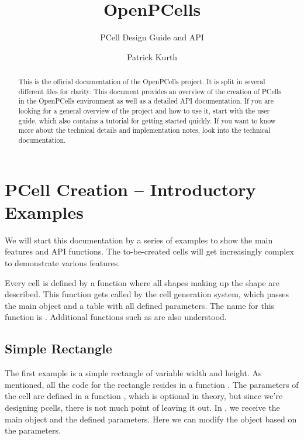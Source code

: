 

\title{OpenPCells}
\subtitle{PCell Design Guide and API}
\author{Patrick Kurth}


\maketitle
\begin{abstract}
    \noindent This is the official documentation of the OpenPCells project.  It is split in several different files for clarity. This document provides an overview
    of the creation of PCells in the OpenPCells environment as well as a detailed API documentation.  If you are looking for a general overview of the project and
    how to use it, start with the user guide, which also contains a tutorial for getting started quickly. If you want to know more about the technical details and
    implementation notes, look into the technical documentation.
\end{abstract}

\tableofcontents

\section{PCell Creation -- Introductory Examples}
We will start this documentation by a series of examples to show the main features and API functions. The to-be-created cells will get increasingly complex to
demonstrate various features.

Every cell is defined by a function where all shapes making up the shape are described. This function gets called by the cell generation system, which passes the
main object and a table with all defined parameters. The name for this function is . Additional functions such as 
are also understood.

\subsection{Simple Rectangle}
The first example is a simple rectangle of variable width and height. As mentioned, all the code for the rectangle resides in a function .
The parameters of the cell are defined in a function , which is optional in theory, but since we're designing pcells, there is not much point
of leaving it out. In , we receive the main object and the defined parameters. Here we can modify the object based on the parameters.


